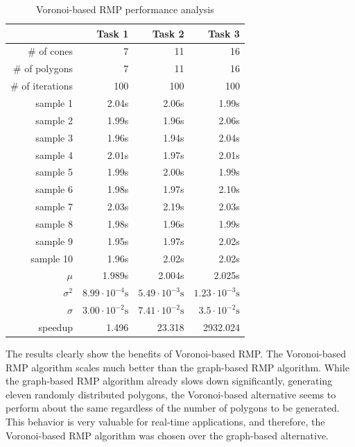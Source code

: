\documentclass[11pt,a4paper,twoside,openright]{report}
\begin{document}
\begin{table}[p]
\centering
\caption{Voronoi-based RMP performance analysis}
\label{tab:voronoiperformanceanalysis}
\begin{tabular}{|r|r|r|r|}
\hline
 & Task 1 & Task 2 & Task 3 \\ \hline
\# of cones & 7 & 11 & 16 \\ \hline
\# of polygons & 7 & 11 & 16 \\ \hline
\# of iterations & 100 & 100 & 100 \\ \hline
sample 1 & 2.04s & 2.06s & 1.99s \\ \hline
sample 2 & 1.99s & 1.96s & 2.06s \\ \hline
sample 3 & 1.96s & 1.94s & 2.04s \\ \hline
sample 4 & 2.01s & 1.97s & 2.01s \\ \hline
sample 5 & 1.99s & 2.00s & 1.99s \\ \hline
sample 6 & 1.98s & 1.97s & 2.10s \\ \hline
sample 7 & 2.03s & 2.19s & 2.03s \\ \hline
sample 8 & 1.98s & 1.96s & 1.99s \\ \hline
sample 9 & 1.95s & 1.97s & 2.02s \\ \hline
sample 10 & 1.96s & 2.02s & 2.02s \\ \hline
$\mu$ & 1.989s & 2.004s & 2.025s \\ \hline
$\sigma^2$ & $8.99 \cdot 10^{-4}\textrm{s}$ & $5.49 \cdot 10^{-3}\textrm{s} $ & $1.23 \cdot 10^{-3}\textrm{s}$ \\ \hline
$\sigma$ & $3.00 \cdot 10^{-2}\textrm{s}$ & $7.41 \cdot 10^{-2}\textrm{s}$ & $3.5 \cdot 10^{-2}\textrm{s}$ \\ \hline
speedup & 1.496 & 23.318 & 2932.024 \\ \hline
\end{tabular}
\end{table}

The results clearly show the benefits of Voronoi-based RMP. The Voronoi-based RMP algorithm scales much better than the graph-based RMP algorithm. While the graph-based RMP algorithm already slows down significantly, generating eleven randomly distributed polygons, the Voronoi-based alternative seems to perform about the same regardless of the number of polygons to be generated. This behavior is very valuable for real-time applications, and therefore, the Voronoi-based RMP algorithm was chosen over the graph-based alternative.
\end{document}

